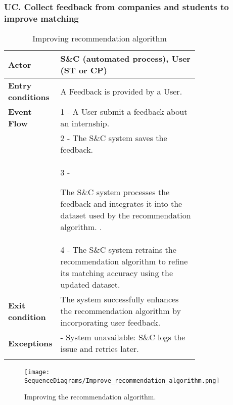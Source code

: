 \subsubsection*{UC\cuc . Collect feedback from companies and students to improve matching}
\begin{center}
    \begin{longtable}{|l|p{0.75\linewidth}|}
        \hline
        \textbf{Actor}            & S\&C (automated process), User (ST or CP) \\
        \hline
        \textbf{Entry conditions} & A Feedback is provided by a User. \\
        \hline
        \textbf{Event Flow}       & 1 - A User submit a feedback about an internship. \\
        & 2 - The S\&C system saves the feedback. \\
        & 3 - 
    \item The S\&C system processes the feedback and integrates it into the dataset used by the recommendation algorithm. . \\
        & 4 - The S\&C system retrains the recommendation algorithm to refine its matching accuracy using the updated dataset. \\
        \hline
        \textbf{Exit condition}   & The system successfully enhances the recommendation algorithm by incorporating user feedback. \\       
        \hline
        \textbf{Exceptions}       & - System unavailable: S\&C logs the issue and retries later. \\
        \hline
        \caption{Improving recommendation algorithm}
        \label{tab:Improve_recommendation_algorithm_usecase}
    \end{longtable}
\end{center}

\begin{figure}[H]
    \begin{center}
        \texttt{[image: SequenceDiagrams/Improve\_recommendation\_algorithm.png]}
        \caption{Improving the recommendation algorithm.}
        \label{fig:improve_recommendation_algorithm_seqd}%
    \end{center}
\end{figure}


